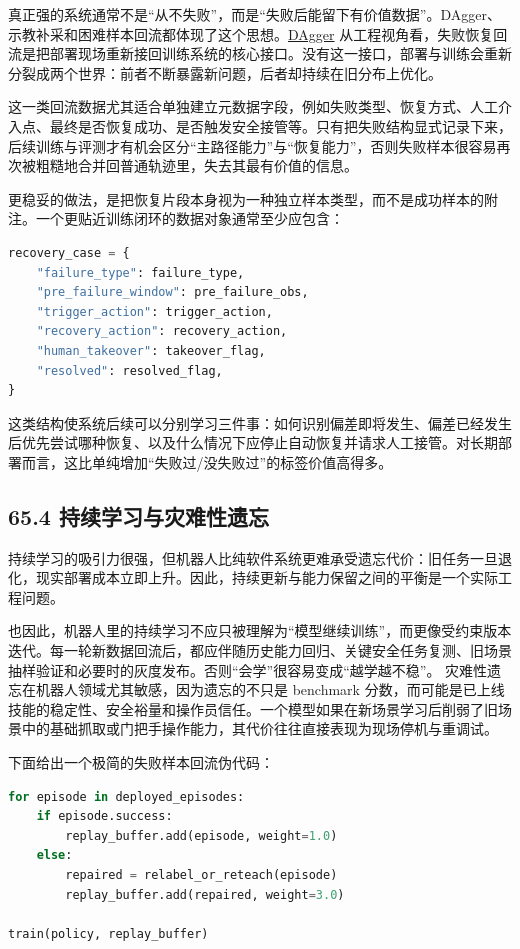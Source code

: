 真正强的系统通常不是“从不失败”，而是“失败后能留下有价值数据”。DAgger、示教补采和困难样本回流都体现了这个思想。\href{https://proceedings.mlr.press/v15/ross11a.html}{DAgger} 从工程视角看，失败恢复回流是把部署现场重新接回训练系统的核心接口。没有这一接口，部署与训练会重新分裂成两个世界：前者不断暴露新问题，后者却持续在旧分布上优化。

这一类回流数据尤其适合单独建立元数据字段，例如失败类型、恢复方式、人工介入点、最终是否恢复成功、是否触发安全接管等。只有把失败结构显式记录下来，后续训练与评测才有机会区分“主路径能力”与“恢复能力”，否则失败样本很容易再次被粗糙地合并回普通轨迹里，失去其最有价值的信息。

更稳妥的做法，是把恢复片段本身视为一种独立样本类型，而不是成功样本的附注。一个更贴近训练闭环的数据对象通常至少应包含：

\begin{lstlisting}[language=python]
recovery_case = {
    "failure_type": failure_type,
    "pre_failure_window": pre_failure_obs,
    "trigger_action": trigger_action,
    "recovery_action": recovery_action,
    "human_takeover": takeover_flag,
    "resolved": resolved_flag,
}
\end{lstlisting}

这类结构使系统后续可以分别学习三件事：如何识别偏差即将发生、偏差已经发生后优先尝试哪种恢复、以及什么情况下应停止自动恢复并请求人工接管。对长期部署而言，这比单纯增加“失败过/没失败过”的标签价值高得多。

\subsection*{65.4 持续学习与灾难性遗忘}


持续学习的吸引力很强，但机器人比纯软件系统更难承受遗忘代价：旧任务一旦退化，现实部署成本立即上升。因此，持续更新与能力保留之间的平衡是一个实际工程问题。

也因此，机器人里的持续学习不应只被理解为“模型继续训练”，而更像受约束版本迭代。每一轮新数据回流后，都应伴随历史能力回归、关键安全任务复测、旧场景抽样验证和必要时的灰度发布。否则“会学”很容易变成“越学越不稳”。 灾难性遗忘在机器人领域尤其敏感，因为遗忘的不只是 benchmark 分数，而可能是已上线技能的稳定性、安全裕量和操作员信任。一个模型如果在新场景学习后削弱了旧场景中的基础抓取或门把手操作能力，其代价往往直接表现为现场停机与重调试。

下面给出一个极简的失败样本回流伪代码：

\begin{lstlisting}[language=python]
for episode in deployed_episodes:
    if episode.success:
        replay_buffer.add(episode, weight=1.0)
    else:
        repaired = relabel_or_reteach(episode)
        replay_buffer.add(repaired, weight=3.0)

train(policy, replay_buffer)
\end{lstlisting}

